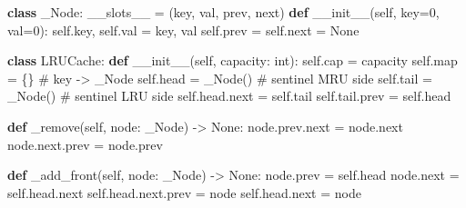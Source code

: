 \documentclass[11pt]{article}
\newenvironment{Shaded}{\begin{snugshade}}{\end{snugshade}}
\newcommand{\BuiltInTok}[1]{\textcolor[rgb]{0.50,0.55,0.55}{#1}}
\newcommand{\CommentTok}[1]{\textcolor[rgb]{0.48,0.49,0.49}{#1}}
\newcommand{\DecValTok}[1]{\textcolor[rgb]{0.96,0.45,0.00}{#1}}
\newcommand{\FunctionTok}[1]{\textcolor[rgb]{0.56,0.27,0.68}{#1}}
\newcommand{\KeywordTok}[1]{\textcolor[rgb]{0.81,0.81,0.76}{\textbf{#1}}}
\newcommand{\NormalTok}[1]{\textcolor[rgb]{0.81,0.81,0.76}{#1}}
\newcommand{\OperatorTok}[1]{\textcolor[rgb]{0.81,0.81,0.76}{#1}}
\newcommand{\StringTok}[1]{\textcolor[rgb]{0.96,0.31,0.31}{#1}}
\newcommand{\VariableTok}[1]{\textcolor[rgb]{0.15,0.68,0.68}{#1}}
\begin{document}

\begin{Shaded}
\begin{Highlighting}[]
\KeywordTok{class}\NormalTok{ \_Node:}
    \FunctionTok{\_\_slots\_\_} \OperatorTok{=}\NormalTok{ (}\StringTok{\textquotesingle{}key\textquotesingle{}}\NormalTok{, }\StringTok{\textquotesingle{}val\textquotesingle{}}\NormalTok{, }\StringTok{\textquotesingle{}prev\textquotesingle{}}\NormalTok{, }\StringTok{\textquotesingle{}next\textquotesingle{}}\NormalTok{)}
    \KeywordTok{def} \FunctionTok{\_\_init\_\_}\NormalTok{(}\VariableTok{self}\NormalTok{, key}\OperatorTok{=}\DecValTok{0}\NormalTok{, val}\OperatorTok{=}\DecValTok{0}\NormalTok{):}
        \VariableTok{self}\NormalTok{.key, }\VariableTok{self}\NormalTok{.val }\OperatorTok{=}\NormalTok{ key, val}
        \VariableTok{self}\NormalTok{.prev }\OperatorTok{=} \VariableTok{self}\NormalTok{.}\BuiltInTok{next} \OperatorTok{=} \VariableTok{None}

\KeywordTok{class}\NormalTok{ LRUCache:}
    \KeywordTok{def} \FunctionTok{\_\_init\_\_}\NormalTok{(}\VariableTok{self}\NormalTok{, capacity: }\BuiltInTok{int}\NormalTok{):}
        \VariableTok{self}\NormalTok{.cap }\OperatorTok{=}\NormalTok{ capacity}
        \VariableTok{self}\NormalTok{.}\BuiltInTok{map} \OperatorTok{=}\NormalTok{ \{\}                       }\CommentTok{\# key {-}\textgreater{} \_Node}
        \VariableTok{self}\NormalTok{.head }\OperatorTok{=}\NormalTok{ \_Node()                 }\CommentTok{\# sentinel MRU side}
        \VariableTok{self}\NormalTok{.tail }\OperatorTok{=}\NormalTok{ \_Node()                 }\CommentTok{\# sentinel LRU side}
        \VariableTok{self}\NormalTok{.head.}\BuiltInTok{next} \OperatorTok{=} \VariableTok{self}\NormalTok{.tail}
        \VariableTok{self}\NormalTok{.tail.prev }\OperatorTok{=} \VariableTok{self}\NormalTok{.head}

    \KeywordTok{def}\NormalTok{ \_remove(}\VariableTok{self}\NormalTok{, node: \_Node) }\OperatorTok{{-}\textgreater{}} \VariableTok{None}\NormalTok{:}
\NormalTok{        node.prev.}\BuiltInTok{next} \OperatorTok{=}\NormalTok{ node.}\BuiltInTok{next}
\NormalTok{        node.}\BuiltInTok{next}\NormalTok{.prev }\OperatorTok{=}\NormalTok{ node.prev}

    \KeywordTok{def}\NormalTok{ \_add\_front(}\VariableTok{self}\NormalTok{, node: \_Node) }\OperatorTok{{-}\textgreater{}} \VariableTok{None}\NormalTok{:}
\NormalTok{        node.prev }\OperatorTok{=} \VariableTok{self}\NormalTok{.head}
\NormalTok{        node.}\BuiltInTok{next} \OperatorTok{=} \VariableTok{self}\NormalTok{.head.}\BuiltInTok{next}
        \VariableTok{self}\NormalTok{.head.}\BuiltInTok{next}\NormalTok{.prev }\OperatorTok{=}\NormalTok{ node}
        \VariableTok{self}\NormalTok{.head.}\BuiltInTok{next} \OperatorTok{=}\NormalTok{ node}


\end{Highlighting}
\end{Shaded}
\end{document}
